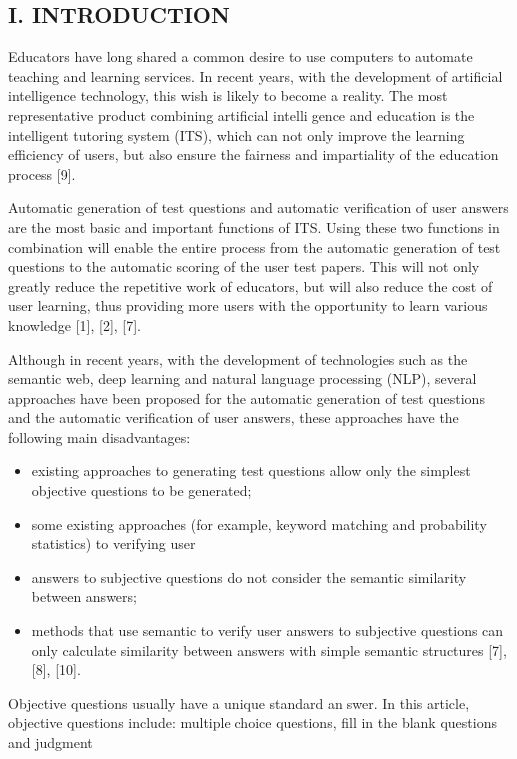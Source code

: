 \documentclass{article}
\begin{document}
\begin{multicols}{2}
\begin{center}
\chapter{I. INTRODUCTION}
\end{center}
\par Educators have long shared a common desire to use
computers to automate teaching and learning services. In
recent years, with the development of artificial intelligence
technology, this wish is likely to become a reality. The
most representative product combining artificial intelligence and education is the intelligent tutoring system
(ITS), which can not only improve the learning efficiency
of users, but also ensure the fairness and impartiality of
the education process [9].
\par Automatic generation of test questions and automatic
verification of user answers are the most basic and
important functions of ITS. Using these two functions
in combination will enable the entire process from the
automatic generation of test questions to the automatic
scoring of the user test papers. This will not only greatly
reduce the repetitive work of educators, but will also
reduce the cost of user learning, thus providing more
users with the opportunity to learn various knowledge
[1], [2], [7].
\par Although in recent years, with the development of
technologies such as the semantic web, deep learning and
natural language processing (NLP), several approaches
have been proposed for the automatic generation of test
questions and the automatic verification of user answers,
these approaches have the following main disadvantages:
\begin{itemize}
    \item existing approaches to generating test questions allow only the simplest objective questions to be generated;
    \item some existing approaches (for example, keyword matching and probability statistics) to verifying user
    \columnbreak
    \item[] answers to subjective questions do not consider the semantic similarity between answers;
    \item methods that use semantic to verify user answers to subjective questions can only calculate similarity between answers with simple semantic structures [7], [8], [10].
\end{itemize}
\par Objective questions usually have a unique standard answer. In this article, objective questions include: multiplechoice questions, fill in the blank questions and judgment

\end{multicols}
\end{document}
